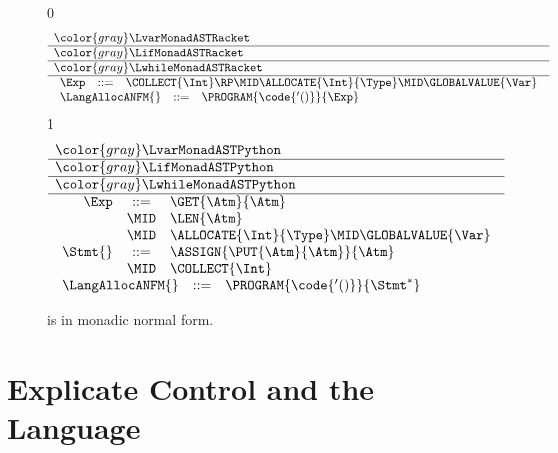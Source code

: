 \documentclass[7x10]{TimesAPriori_MIT}%
\newcommand{\gray}[1]{{\color{gray} #1}}
\def\racketEd{0}
\def\pythonEd{1}
\def\edition{1}
\newcommand{\pythonColor}[0]{}
\numberwithin{theorem}{chapter}
\numberwithin{definition}{chapter}
\numberwithin{equation}{chapter}
\begin{document}
\newcommand{\LtupMonadASTRacket}{
\begin{array}{rcl}
\Exp &::=& \COLLECT{\Int} \RP \MID \ALLOCATE{\Int}{\Type}
   \MID \GLOBALVALUE{\Var}
\end{array}

}

\newcommand{\LtupMonadASTPython}{
\begin{array}{rcl}
\Exp &::=& \GET{\Atm}{\Atm} \\
     &\MID& \LEN{\Atm}\\
   &\MID& \ALLOCATE{\Int}{\Type}
    \MID \GLOBALVALUE{\Var} \\
\Stmt{} &::=& \ASSIGN{\PUT{\Atm}{\Atm}}{\Atm} \\
   &\MID& \COLLECT{\Int}
\end{array}
}

\begin{figure}[tp]
\centering
\begin{tcolorbox}[colback=white]
\small
{\if\edition\racketEd    
\[
\begin{array}{l}
  \gray{\LvarMonadASTRacket} \\ \hline
  \gray{\LifMonadASTRacket} \\ \hline
  \gray{\LwhileMonadASTRacket} \\ \hline
    \LtupMonadASTRacket \\
\begin{array}{rcl}
\LangAllocANFM{}  &::=& \PROGRAM{\code{'()}}{\Exp} 
\end{array}
\end{array}
\]
\fi}
{\if\edition\pythonEd\pythonColor
\[
\begin{array}{l}
  \gray{\LvarMonadASTPython} \\ \hline
  \gray{\LifMonadASTPython} \\ \hline
  \gray{\LwhileMonadASTPython} \\ \hline
  \LtupMonadASTPython   \\
  \begin{array}{rcl}
     \LangAllocANFM{} &::=& \PROGRAM{\code{'()}}{\Stmt^{*}}
  \end{array}
\end{array}
\]
\fi}
\end{tcolorbox}

\caption{\LangAllocANF{} is \LangAlloc{} in monadic normal form.}
\label{fig:Lvec-anf-syntax}
\end{figure}


\section{Explicate Control and the \LangCVec{} Language}
\label{sec:explicate-control-r3}
\end{document}

